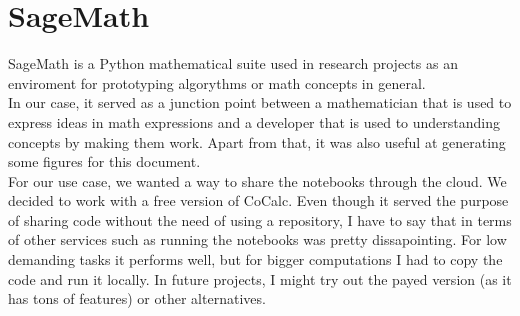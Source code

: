 \section{SageMath}

SageMath\cite{Sage} is a Python mathematical suite used in research projects as
an enviroment for prototyping algorythms or math concepts in general.\\

In our case, it served as a junction point between a mathematician that is used
to express ideas in math expressions and a developer that is used to
understanding concepts by making them work. Apart from that, it was also
useful at generating some figures for this document.\\

For our use case, we wanted a way to share the notebooks through the cloud.
We decided to work with a free version of CoCalc\cite{cocalc}. Even though it
served the purpose of sharing code without the need of using a repository,
I have to say that in terms of other services such as running the notebooks
was pretty dissapointing. For low demanding tasks it performs well, but for
bigger computations I had to copy the code and run it locally. In future
projects, I might try out the payed version (as it has tons of features)
or other alternatives.\\
